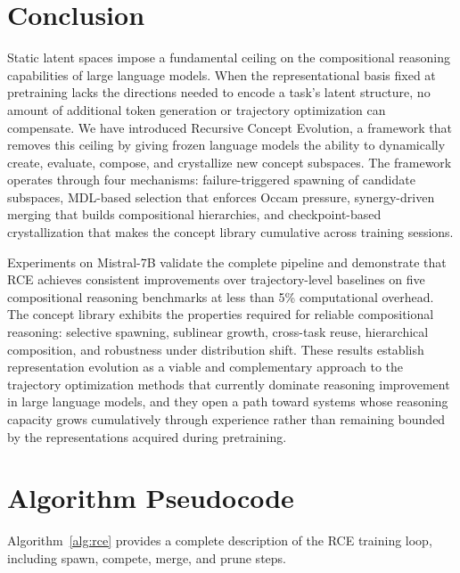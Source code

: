 \documentclass[11pt]{article}
\begin{document}
\section{Conclusion}

Static latent spaces impose a fundamental ceiling on the compositional reasoning capabilities of large language models. When the representational basis fixed at pretraining lacks the directions needed to encode a task's latent structure, no amount of additional token generation or trajectory optimization can compensate. We have introduced Recursive Concept Evolution, a framework that removes this ceiling by giving frozen language models the ability to dynamically create, evaluate, compose, and crystallize new concept subspaces. The framework operates through four mechanisms: failure-triggered spawning of candidate subspaces, MDL-based selection that enforces Occam pressure, synergy-driven merging that builds compositional hierarchies, and checkpoint-based crystallization that makes the concept library cumulative across training sessions.

Experiments on Mistral-7B validate the complete pipeline and demonstrate that RCE achieves consistent improvements over trajectory-level baselines on five compositional reasoning benchmarks at less than 5\% computational overhead. The concept library exhibits the properties required for reliable compositional reasoning: selective spawning, sublinear growth, cross-task reuse, hierarchical composition, and robustness under distribution shift. These results establish representation evolution as a viable and complementary approach to the trajectory optimization methods that currently dominate reasoning improvement in large language models, and they open a path toward systems whose reasoning capacity grows cumulatively through experience rather than remaining bounded by the representations acquired during pretraining.



\newpage
\appendix

\section{Algorithm Pseudocode}

Algorithm~\ref{alg:rce} provides a complete description of the RCE training loop, including spawn, compete, merge, and prune steps.
\end{document}
